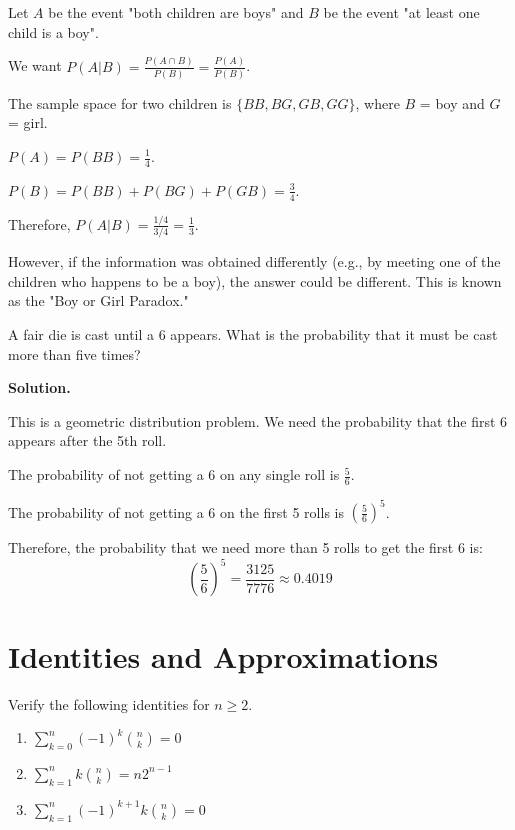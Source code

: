 Let $A$ be the event "both children are boys" and $B$ be the event "at least one child is a boy".

We want $P(A|B) = \frac{P(A \cap B)}{P(B)} = \frac{P(A)}{P(B)}$.

The sample space for two children is $\{BB, BG, GB, GG\}$, where $B$ = boy and $G$ = girl.

$P(A) = P(BB) = \frac{1}{4}$.

$P(B) = P(BB) + P(BG) + P(GB) = \frac{3}{4}$.

Therefore, $P(A|B) = \frac{1/4}{3/4} = \frac{1}{3}$.

However, if the information was obtained differently (e.g., by meeting one of the children who happens to be a boy), the answer could be different. This is known as the "Boy or Girl Paradox."


\begin{problembox}
A fair die is cast until a 6 appears. What is the probability that it must be cast more than five times?
\end{problembox}

\noindent\textbf{Solution.}

This is a geometric distribution problem. We need the probability that the first 6 appears after the 5th roll.

The probability of not getting a 6 on any single roll is $\frac{5}{6}$.

The probability of not getting a 6 on the first 5 rolls is $\left(\frac{5}{6}\right)^5$.

Therefore, the probability that we need more than 5 rolls to get the first 6 is:
\[ \left(\frac{5}{6}\right)^5 = \frac{3125}{7776} \approx 0.4019 \]


\section{Identities and Approximations}

\begin{problembox}
Verify the following identities for $n\geq 2$.
\begin{enumerate}[label=(\alph*)]
    \item $\sum_{k=0}^{n}(-1)^{k}\binom{n}{k}=0$
    \item $\sum_{k=1}^{n}k\binom{n}{k}=n2^{n-1}$
    \item $\sum_{k=1}^{n}(-1)^{k+1}k\binom{n}{k}=0$
\end{enumerate}
\end{problembox}

